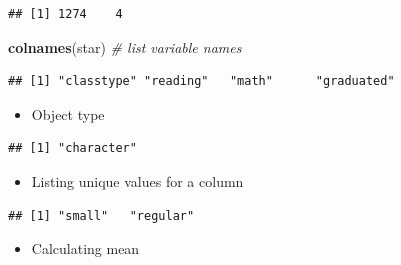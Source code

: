 \documentclass[
]{book}
\newenvironment{Shaded}{\begin{snugshade}}{\end{snugshade}}
\newcommand{\CommentTok}[1]{\textcolor[rgb]{0.56,0.35,0.01}{\textit{#1}}}
\newcommand{\FunctionTok}[1]{\textcolor[rgb]{0.13,0.29,0.53}{\textbf{#1}}}
\newcommand{\NormalTok}[1]{#1}
\newcommand{\SpecialCharTok}[1]{\textcolor[rgb]{0.81,0.36,0.00}{\textbf{#1}}}
\providecommand{\tightlist}{%
  \setlength{\itemsep}{0pt}\setlength{\parskip}{0pt}}
\begin{document}
\begin{verbatim}
## [1] 1274    4
\end{verbatim}

\begin{Shaded}
\begin{Highlighting}[]
\FunctionTok{colnames}\NormalTok{(star) }\CommentTok{\# list variable names}
\end{Highlighting}
\end{Shaded}

\begin{verbatim}
## [1] "classtype" "reading"   "math"      "graduated"
\end{verbatim}

\begin{itemize}
\tightlist
\item
  Object type
\end{itemize}

\begin{Shaded}
\end{Shaded}

\begin{verbatim}
## [1] "character"
\end{verbatim}

\begin{itemize}
\tightlist
\item
  Listing unique values for a column
\end{itemize}

\begin{Shaded}
\end{Shaded}

\begin{verbatim}
## [1] "small"   "regular"
\end{verbatim}

\begin{itemize}
\tightlist
\item
  Calculating mean
\end{itemize}

\begin{Shaded}
\end{Shaded}
\end{document}
